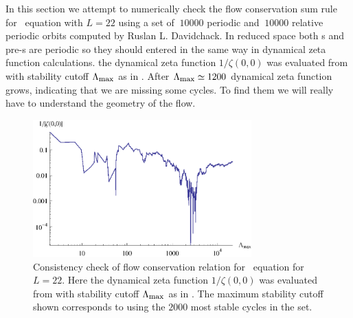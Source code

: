 In this section we attempt to numerically check the
flow conservation sum rule  for \KS\ equation with $L=22$ 
using a set of $~10000$ periodic and $~10000$ relative
periodic orbits  computed by Ruslan L. Davidchack.
In reduced space both \rpo s and pre-\po s are periodic so they should
entered in the same way in dynamical zeta function calculations. the dynamical zeta function $1/\zeta(0,0)$ was evaluated
from  with stability cutoff $\Lambda_{\mbox{\footnotesize max}}$ as
in . After $\Lambda_{\mbox{\footnotesize max}}\simeq1200$
dynamical zeta function grows, indicating that we are missing some cycles.
To find them we will really have to understand the geometry of the flow.

\begin{figure}
    \vspace*{-5pt}
\begin{center}
	\includegraphics[width=0.75\textwidth]{../figs/ksStabOrder2000}
\end{center}
\caption[flow conservation relation for KSe, $L=22$]
    {
Consistency check of flow conservation relation 
for \KS\ equation  for $L=22$.
Here the dynamical zeta function $1/\zeta(0,0)$ was evaluated
from  with stability cutoff $\Lambda_{\mbox{\footnotesize max}}$ as
in . The maximum stability cutoff shown corresponds
to using the $2000$ most stable cycles in the set.
	}
\label{fig:zetaStabOrderKS22}
    \vspace*{-5pt}
\end{figure}



